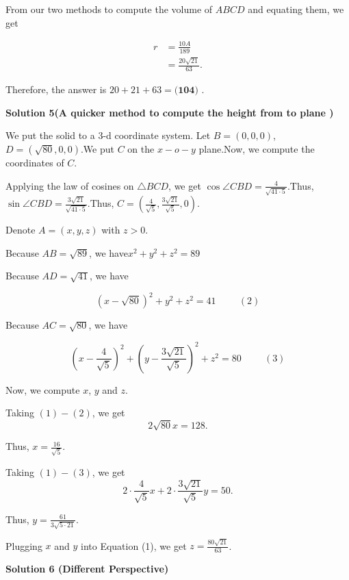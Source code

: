 \begin{enumerate}
 From our two methods to compute the volume of $ABCD$ and equating them, we get

 \begin{align*}r & = \frac{10A}{189} \\& = \frac{20 \sqrt{21}}{63} .\end{align*}


 Therefore, the answer is $20 + 21 + 63 = \boxed{\textbf{(104) }}$.

 



\textbf{Solution 5(A quicker method to compute the height from  to plane )}

We put the solid to a 3-d coordinate system. Let $B = \left( 0, 0, 0 \right)$, $D = \left( \sqrt{80}, 0, 0 \right)$.We put $C$ on the $x-o-y$ plane.Now, we compute the coordinates of $C$.

 Applying the law of cosines on $\triangle BCD$, we get $\cos \angle CBD = \frac{4}{\sqrt{41 \cdot 5}}$.Thus, $\sin \angle CBD = \frac{3 \sqrt{21}}{\sqrt{41 \cdot 5}}$.Thus, $C = \left( \frac{4}{\sqrt{5}} , \frac{3 \sqrt{21}}{\sqrt{5}} , 0 \right)$.

 Denote $A = \left( x, y , z \right)$ with $z > 0$.

 Because $AB = \sqrt{89}$, we have$x^2 + y^2 + z^2 = 89$

 Because $AD = \sqrt{41}$, we have

 
 \[\left( x - \sqrt{80} \right)^2 + y^2 + z^2 = 41 \hspace{1cm} (2)\]

 Because $AC = \sqrt{80}$, we have

 
 \[\left( x - \frac{4}{\sqrt{5}} \right)^2 + \left( y - \frac{3 \sqrt{21}}{\sqrt{5}} \right)^2  + z^2 = 80 \hspace{1cm} (3)\]

 Now, we compute $x$, $y$ and $z$.

 Taking $(1)-(2)$, we get
 \[2 \sqrt{80} x = 128 .\]

 Thus, $x = \frac{16}{\sqrt{5}}$.

 Taking $(1) - (3)$, we get
 \[2 \cdot \frac{4}{\sqrt{5}} x + 2 \cdot \frac{3 \sqrt{21}}{\sqrt{5}} y = 50 .\]

 Thus, $y = \frac{61}{3 \sqrt{5 \cdot 21}}$.

 Plugging $x$ and $y$ into Equation (1), we get $z = \frac{80 \sqrt{21}}{63}$.

 



\textbf{Solution 6 (Different Perspective)}


\end{enumerate}
